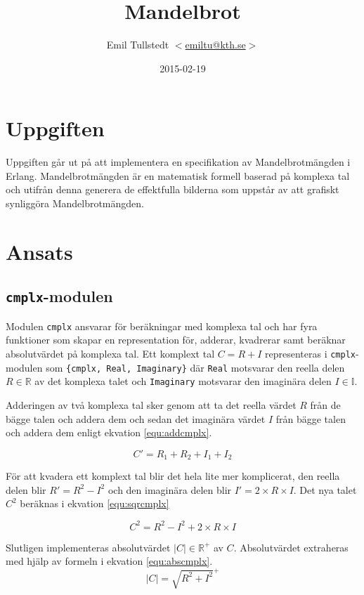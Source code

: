 \documentclass[a4paper, 11pt]{article}
\title{Mandelbrot}
\author{Emil Tullstedt \href{mailto:emiltu@kth.se}{$<$emiltu@kth.se$>$}}
\date{2015-02-19}
\begin{document}
\maketitle

\section{Uppgiften}
\label{sec:uppgiften}
Uppgiften går ut på att implementera en specifikation av Mandelbrotmängden i Erlang. Mandelbrotmängden är en matematisk formell baserad på komplexa tal och utifrån denna generera de effektfulla bilderna som uppstår av att grafiskt synliggöra Mandelbrotmängden.

\section{Ansats}

\subsection{\texttt{cmplx}-modulen}
Modulen \texttt{cmplx} ansvarar för beräkningar med komplexa tal och har fyra funktioner som skapar en representation för, adderar, kvadrerar samt beräknar absolutvärdet på komplexa tal. Ett komplext tal $C = R + I$ representeras i \texttt{cmplx}-modulen som \lstinline${cmplx, Real, Imaginary}$ där \texttt{Real} motsvarar den reella delen $R \in \mathbb{R}$ av det komplexa talet och \texttt{Imaginary} motsvarar den imaginära delen $I \in \mathbb{I}$.

Adderingen av två komplexa tal sker genom att ta det reella värdet $R$ från de bägge talen och addera dem och sedan det imaginära värdet $I$ från bägge talen och addera dem enligt ekvation \ref{equ:addcmplx}.

\begin{equation}\label{equ:addcmplx}
C' = R_1 + R_2 + I_1 + I_2
\end{equation}

För att kvadera ett komplext tal blir det hela lite mer komplicerat, den reella delen blir $R' = R^2 - I^2$ och den imaginära delen blir $I' = 2\times R\times I$. Det nya talet $C^2$ beräknas i ekvation \ref{equ:sqrcmplx}

\begin{equation} \label{equ:sqrcmplx}
C^2 = R^2 - I^2 + 2\times R\times I
\end{equation}

Slutligen implementeras absolutvärdet $|C|\in \mathbb{R}^+$ av $C$. Absolutvärdet extraheras med hjälp av formeln i ekvation \ref{equ:abscmplx}.
\begin{equation} \label{equ:abscmplx}
|C| = \sqrt{R^2+I^2}^+
\end{equation}
\end{document}
